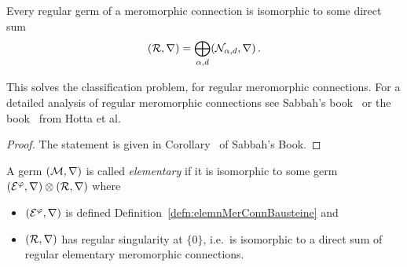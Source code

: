 \begin{prop}
  Every regular germ of a meromorphic connection is isomorphic to some direct
  sum
  \[
    (\mathcal{R},\nabla)=\bigoplus_{\alpha,d}(\mathcal{N}_{\alpha,d},\nabla)\,.
  \]
  \begin{s-rem}
    This solves the classification problem, for regular meromorphic
    connections.
    For a detailed analysis of regular meromorphic connections see Sabbah's
    book~\cite[Sec.II.2]{sabbah2007isomonodromic} or the
    book~\cite[Sec.5.2]{hotta2008} from Hotta et al.
  \end{s-rem}
  \begin{comment}
    \begin{enumerate}
      \item Every germ of a meromorphic connection of rank one is isomorphic to
        some germ
        \[
          (\cE^\phi,\nabla)\otimes(\cN_{\alpha,0},\nabla) \,.
        \]
      \item Two such rank one germs corresponding to $(\phi_1,\alpha_1)$ and
        $(\phi_2,\alpha_2)$ are isomorphic if and only if
        \begin{itemize}
          \item $\phi_1-\phi_2$ has no pole and
          \item $\alpha_1-\alpha_2\in\Z$.
        \end{itemize}
    \end{enumerate}
  \end{comment}
\end{prop}
\begin{proof}
  The statement is given in
  Corollary~\cite[Cor.II.2.9]{sabbah2007isomonodromic} of Sabbah's Book.
\end{proof}
\begin{defn}
  A germ $(\mathcal{M},\nabla)$ is called \emph{elementary} if it is isomorphic to
  some germ $(\mathcal{E}^\varphi,\nabla)\otimes(\mathcal{R},\nabla)$ where
  \begin{itemize}
    \item $(\mathcal{E}^\varphi,\nabla)$ is defined 
      Definition~\ref{defn:elemnMerConnBausteine} and
    \item $(\mathcal{R},\nabla)$ has regular singularity at $\{0\}$, i.e.\ is
      isomorphic to a direct sum of regular elementary meromorphic connections.
  \end{itemize}
\end{defn}
